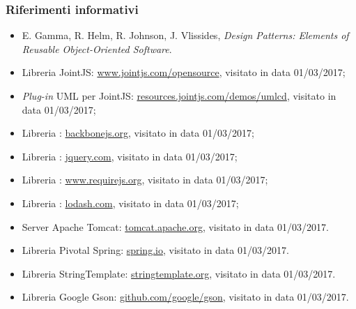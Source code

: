 \subsubsection{Riferimenti informativi}
\begin{itemize}
	\item E. Gamma, R. Helm, R. Johnson, J. Vlissides, \emph{Design Patterns: Elements of Reusable Object-Oriented Software}.
	\item Libreria JointJS: \url{www.jointjs.com/opensource}, visitato in data 01/03/2017;
	\item \emph{Plug-in} UML per JointJS: \url{resources.jointjs.com/demos/umlcd}, visitato in data 01/03/2017;
	\item Libreria \backbonejs: \url{backbonejs.org}, visitato in data 01/03/2017;
	\item Libreria \jquery: \url{jquery.com}, visitato in data 01/03/2017;
	\item Libreria \requirejs: \url{www.requirejs.org}, visitato in data 01/03/2017;
	\item Libreria \lodash: \url{lodash.com}, visitato in data 01/03/2017;
	\item Server Apache Tomcat: \url{tomcat.apache.org}, visitato in data 01/03/2017.
	\item Libreria Pivotal Spring: \url{spring.io}, visitato in data 01/03/2017.
	\item Libreria StringTemplate: \url{stringtemplate.org}, visitato in data 01/03/2017.
	\item Libreria Google Gson: \url{github.com/google/gson}, visitato in data 01/03/2017.
\end{itemize}
